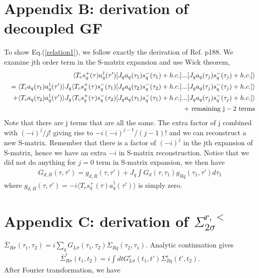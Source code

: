 \documentclass[aps,prb,superscriptaddress]{revtex4-2}
\begin{document}
\section*{Appendix B: derivation of decoupled GF}
To show Eq.(\ref{relation1}), we follow exactly the derivation of Ref. p188. We examine jth order term in the S-matrix expansion and use Wick theorem,
\begin{eqnarray}
&& \langle T_c s^+_q(\tau) a^\dagger_q(\tau') [J_q a_{q}(\tau_1) s^-_q(\tau_1) +h.c.] ...
[J_q a_{q}(\tau_j) s^-_q(\tau_j) +h.c.]\rangle \nonumber \\
&& =\langle T_c a_q(\tau_1) a^\dagger_q(\tau')\rangle J_q \langle T_c s^+_q(\tau)s^-_q(\tau_1) [J_q a_{q}(\tau_2) s^-_q(\tau_2)+h.c. ] ...
[J_q a_{q}(\tau_j) s^-_q(\tau_j) +h.c.]\rangle \nonumber \\
&&+\langle T_c a_q(\tau_2) a^\dagger_q(\tau')\rangle J_q \langle T_c s^+_q(\tau)s^-_q(\tau_2) [J_q a_{q}(\tau_1) s^-_q(\tau_1)+h.c. ] ...
[J_q a_{q}(\tau_j) s^-_q(\tau_j) +h.c.]\rangle \nonumber \\
&& + ~ {\rm remaining ~ j-2 ~ terms}
\end{eqnarray}
Note that there are j terms that are all the same. The extra factor of j combined with $(-i)^j/j!$ giving rise to $-i (-i)^{j-1}/(j-1)!$ and we can reconstruct a new S-matrix. Remember that there is a factor of $(-i)^j$ in the jth expansion of S-matrix, hence we have an extra $-i$ in S-matrix reconstruction. Notice that we did not do anything for $j=0$ term in S-matrix expansion, we then have
\begin{gather}
G_{d,R}(\tau,\tau') = g_{d,R}(\tau,\tau') + J_q \int G_d(\tau,\tau_1) g_{Rq}(\tau_1,\tau')  d\tau_1
\end{gather}
where $g_{d,R}(\tau,\tau')=-i\langle T_c s^+_q(\tau) a^\dagger_q(\tau')\rangle$ is simply zero.

\section*{Appendix C: derivation of $\Sigma_{2\sigma}^{r,<}$}
${\bar \Sigma}_{R\sigma}(\tau_1,\tau_2) =i\sum_q G_{L\bar\sigma}(\tau_1,\tau_2)\Sigma_{Rq}(\tau_2,\tau_1)$. Analytic continuation gives
\begin{eqnarray}
{\bar \Sigma}_{R\sigma}^r(t_1,t_2) =i\int dt G_{L\bar\sigma}^r(t_1, t')\Sigma_{Rq}^r(t', t_2).
\end{eqnarray}
After Fourier transformation, we have
\end{document}
